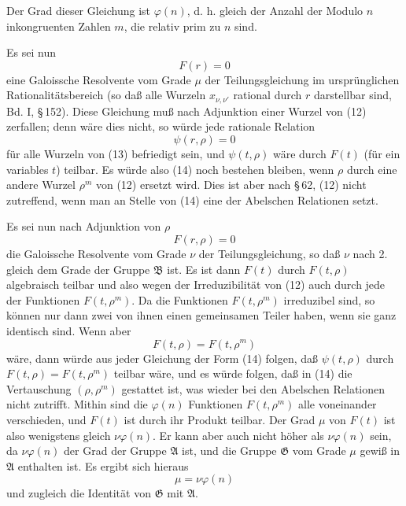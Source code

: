 \documentclass[11pt]{article}
\begin{document}
Der Grad dieser Gleichung ist $\varphi(n)$, d. h. gleich der Anzahl der Modulo $n$
inkongruenten Zahlen $m$, die relativ prim zu $n$ sind.

Es sei nun
\begin{equation}
 F(r)=0
\tag{13}
\end{equation}
eine Galoissche Resolvente vom Grade $\mu$ der Teilungsgleichung im ursprünglichen
Rationalitätsbereich (so daß alle Wurzeln $x_{\nu,\nu'}$ rational durch $r$ darstellbar sind,
Bd. I, \S\,152). Diese Gleichung muß nach Adjunktion einer Wurzel von (12) zerfallen;
denn wäre dies nicht, so würde jede rationale Relation
\begin{equation}
 \psi(r,\rho)=0
\tag{14}
\end{equation}
für alle Wurzeln von (13) befriedigt sein, und $\psi(t,\rho)$ wäre durch $F(t)$ (für ein
variables $t$) teilbar. Es würde also (14) noch bestehen bleiben, wenn $\rho$ durch eine
andere Wurzel $\rho^m$ von (12) ersetzt wird. Dies ist aber nach \S\,62, (12) nicht
zutreffend, wenn man an Stelle von (14) eine der Abelschen Relationen setzt.

Es sei nun nach Adjunktion von $\rho$
\begin{equation}
 F(r,\rho)=0
\tag{15}
\end{equation}
die Galoissche Resolvente vom Grade $\nu$ der Teilungsgleichung, so daß $\nu$ nach 2.
gleich dem Grade der Gruppe $\mathfrak B$ ist. Es ist dann $F(t)$ durch $F(t,\rho)$ algebraisch
teilbar und also wegen der Irreduzibilität von (12) auch durch jede der Funktionen
$F(t,\rho^m)$. Da die Funktionen $F(t,\rho^m)$ irreduzibel sind, so können nur dann zwei
von ihnen einen gemeinsamen Teiler haben, wenn sie ganz identisch sind. Wenn aber
\[
 F(t,\rho)=F(t,\rho^m)
\]
wäre, dann würde aus jeder Gleichung der Form (14) folgen, daß $\psi(t,\rho)$ durch
$F(t,\rho)=F(t,\rho^m)$ teilbar wäre, und es würde folgen, daß in (14) die Vertauschung
$(\rho,\rho^m)$ gestattet ist, was wieder bei den Abelschen Relationen nicht zutrifft.
Mithin sind die $\varphi(n)$ Funktionen $F(t,\rho^m)$ alle voneinander verschieden, und
$F(t)$ ist durch ihr Produkt teilbar. Der Grad $\mu$ von $F(t)$ ist also wenigstens gleich
$\nu\varphi(n)$. Er kann aber auch nicht höher als $\nu\varphi(n)$ sein, da $\nu\varphi(n)$ der
Grad der Gruppe $\mathfrak A$ ist, und die Gruppe $\mathfrak G$ vom Grade $\mu$ gewiß in
$\mathfrak A$ enthalten ist. Es ergibt sich hieraus
\begin{equation}
 \mu=\nu\varphi(n)
\tag{16}
\end{equation}
und zugleich die Identität von $\mathfrak G$ mit $\mathfrak A$.
\end{document}

